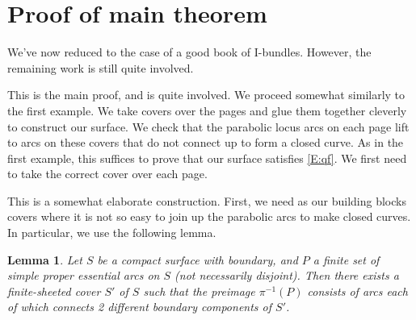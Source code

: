\documentclass[12pt]{amsart}
\newtheorem{lemma}[theorem]{Lemma}
\theoremstyle{definition}
\theoremstyle{remark}
\begin{document}
\section{Proof of main theorem}

We've now reduced to the case of a good book of I-bundles. However, the
remaining work is still quite involved.

This is the main proof, and is quite involved. We proceed somewhat similarly to
the first example. We take covers over the pages and glue them together
cleverly to construct our surface. We check that the parabolic locus arcs on
each page lift to arcs on these covers that do not connect up to form a closed
curve. As in the first example, this suffices to prove that our surface
satisfies \eqref{E:qf}. We first need to take the correct cover over each page.

This is a somewhat elaborate construction. First, we need as our building
blocks covers where it is not so easy to join up the parabolic arcs to make
closed curves. In particular, we use the following lemma.

\begin{lemma}

Let $S$ be a compact surface with boundary, and $P$ a finite set of simple
proper essential arcs on $S$ (not necessarily disjoint).  Then there exists
a finite-sheeted cover $S'$ of $S$ such that the preimage $\pi^{-1}(P)$
consists of arcs each of which connects 2 different boundary components of
$S'$.

\end{lemma}
\end{document}
